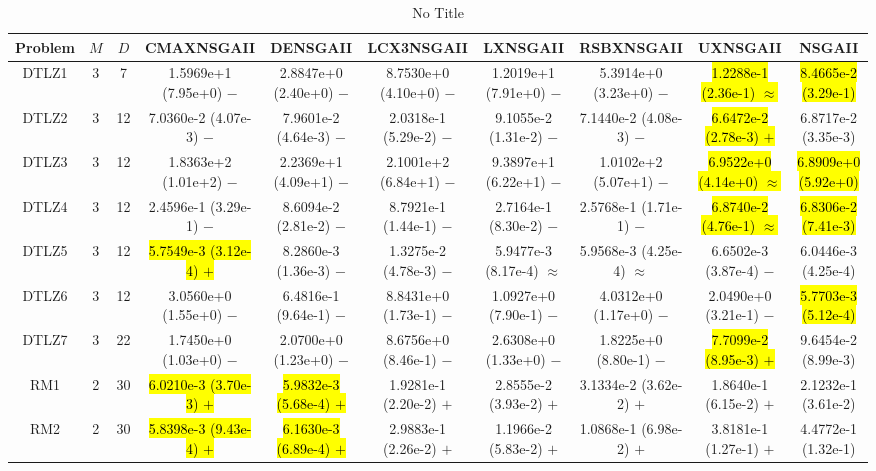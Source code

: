 \documentclass[journal]{IEEEtran}
\begin{document}
\begin{table*}[htbp]
\renewcommand{\arraystretch}{1.2}
\centering
\caption{No Title}
\begin{tabular}{cccccccccc}
\toprule
Problem&$M$&$D$&CMAXNSGAII&DENSGAII&LCX3NSGAII&LXNSGAII&RSBXNSGAII&UXNSGAII&NSGAII\\
\midrule
\multirow{1}{*}{DTLZ1}&3&7&1.5969e+1 (7.95e+0) $-$&2.8847e+0 (2.40e+0) $-$&8.7530e+0 (4.10e+0) $-$&1.2019e+1 (7.91e+0) $-$&5.3914e+0 (3.23e+0) $-$&\hl{1.2288e-1 (2.36e-1) $\approx$}&\hl{8.4665e-2 (3.29e-1)}\\
\hline
\multirow{1}{*}{DTLZ2}&3&12&7.0360e-2 (4.07e-3) $-$&7.9601e-2 (4.64e-3) $-$&2.0318e-1 (5.29e-2) $-$&9.1055e-2 (1.31e-2) $-$&7.1440e-2 (4.08e-3) $-$&\hl{6.6472e-2 (2.78e-3) $+$}&6.8717e-2 (3.35e-3)\\
\hline
\multirow{1}{*}{DTLZ3}&3&12&1.8363e+2 (1.01e+2) $-$&2.2369e+1 (4.09e+1) $-$&2.1001e+2 (6.84e+1) $-$&9.3897e+1 (6.22e+1) $-$&1.0102e+2 (5.07e+1) $-$&\hl{6.9522e+0 (4.14e+0) $\approx$}&\hl{6.8909e+0 (5.92e+0)}\\
\hline
\multirow{1}{*}{DTLZ4}&3&12&2.4596e-1 (3.29e-1) $-$&8.6094e-2 (2.81e-2) $-$&8.7921e-1 (1.44e-1) $-$&2.7164e-1 (8.30e-2) $-$&2.5768e-1 (1.71e-1) $-$&\hl{6.8740e-2 (4.76e-1) $\approx$}&\hl{6.8306e-2 (7.41e-3)}\\
\hline
\multirow{1}{*}{DTLZ5}&3&12&\hl{5.7549e-3 (3.12e-4) $+$}&8.2860e-3 (1.36e-3) $-$&1.3275e-2 (4.78e-3) $-$&5.9477e-3 (8.17e-4) $\approx$&5.9568e-3 (4.25e-4) $\approx$&6.6502e-3 (3.87e-4) $-$&6.0446e-3 (4.25e-4)\\
\hline
\multirow{1}{*}{DTLZ6}&3&12&3.0560e+0 (1.55e+0) $-$&6.4816e-1 (9.64e-1) $-$&8.8431e+0 (1.73e-1) $-$&1.0927e+0 (7.90e-1) $-$&4.0312e+0 (1.17e+0) $-$&2.0490e+0 (3.21e-1) $-$&\hl{5.7703e-3 (5.12e-4)}\\
\hline
\multirow{1}{*}{DTLZ7}&3&22&1.7450e+0 (1.03e+0) $-$&2.0700e+0 (1.23e+0) $-$&8.6756e+0 (8.46e-1) $-$&2.6308e+0 (1.33e+0) $-$&1.8225e+0 (8.80e-1) $-$&\hl{7.7099e-2 (8.95e-3) $+$}&9.6454e-2 (8.99e-3)\\
\hline
\multirow{1}{*}{RM1}&2&30&\hl{6.0210e-3 (3.70e-3) $+$}&\hl{5.9832e-3 (5.68e-4) $+$}&1.9281e-1 (2.20e-2) $+$&2.8555e-2 (3.93e-2) $+$&3.1334e-2 (3.62e-2) $+$&1.8640e-1 (6.15e-2) $+$&2.1232e-1 (3.61e-2)\\
\hline
\multirow{1}{*}{RM2}&2&30&\hl{5.8398e-3 (9.43e-4) $+$}&\hl{6.1630e-3 (6.89e-4) $+$}&2.9883e-1 (2.26e-2) $+$&1.1966e-2 (5.83e-2) $+$&1.0868e-1 (6.98e-2) $+$&3.8181e-1 (1.27e-1) $+$&4.4772e-1 (1.32e-1)\\
\hline

\end{tabular}
\end{table*}
\end{document}
